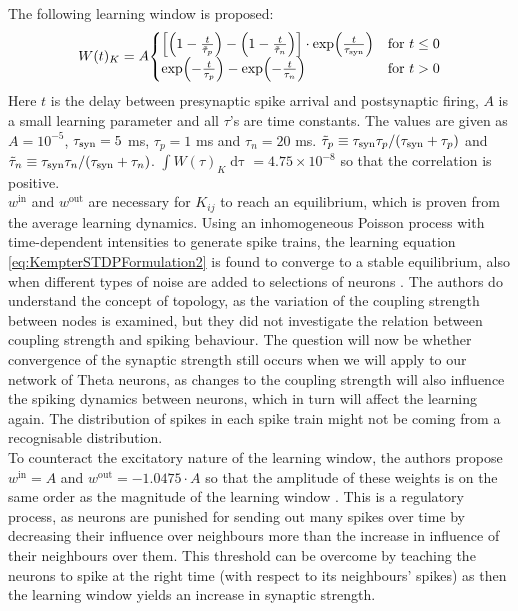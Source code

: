 The following learning window is proposed:
\begin{align}
W(t)_K = A
\begin{cases}
\left[\left(1-\frac{t}{\tilde{\tau}_{p}}\right) - \left(1-\frac{t}{\tilde{\tau}_{n}}\right)\right] \cdot \exp \left( \frac{t}{\tau_{\rm syn}} \right) & \text{for } t \leq 0 \\
 \exp \left(-\frac{t}{\tau_{p}}\right) - \exp \left(-\frac{t}{\tau_{n}} \right) & \text{for } t > 0
\end{cases} \label{eq:learningwindowKempter1999}
\end{align}
Here $t$ is the delay between presynaptic spike arrival and postsynaptic firing, $A$ is a small learning parameter and all $\tau$'s are time constants. The values are given as $A = 10^{-5}$, $\tau_{\rm syn} = 5$ ms, $\tau_{p} = 1$ ms and $\tau_{n} = 20$ ms. $\tilde{\tau}_{p} \equiv \tau_{\rm syn} \tau_{p} / (\tau_{\rm syn} + \tau_{p})$ and $\tilde{\tau}_{n} \equiv \tau_{\rm syn} \tau_{n} / (\tau_{\rm syn} + \tau_{n})$. $\int W(\tau)_K \mathop{d \tau} = 4.75 \times 10^{-8}$ so that the correlation is positive. \\

$w^{\mathrm{in}}$ and $w^{\mathrm{out}}$ are necessary for $K_{ij}$ to reach an equilibrium, which is proven from the average learning dynamics. Using an inhomogeneous Poisson process with time-dependent intensities to generate spike trains, the learning equation \eqref{eq:KempterSTDPFormulation2} is found to converge to a stable equilibrium, also when different types of noise are added to selections of neurons \cite{Kempter1999}. The authors do understand the concept of topology, as the variation of the coupling strength between nodes is examined, but they did not investigate the relation between coupling strength and spiking behaviour. The question will now be whether convergence of the synaptic strength still occurs when we will apply \STDP to our network of Theta neurons, as changes to the coupling strength will also influence the spiking dynamics between neurons, which in turn will affect the learning again. The distribution of spikes in each spike train might not be coming from a recognisable distribution.\\

To counteract the excitatory nature of the learning window, the authors propose $w^{\mathrm{in}} = A$ and $w^{\mathrm{out}} = -1.0475 \cdot A$ so that the amplitude of these weights is on the same order as the magnitude of the learning window \cite{Kempter1999}. This is a regulatory process, as neurons are punished for sending out  many spikes over time by decreasing their influence over neighbours more than the increase in influence of their neighbours over them. This threshold can be overcome by teaching the neurons to spike at the right time (with respect to its neighbours' spikes) as then the learning window yields an increase in synaptic strength.%


